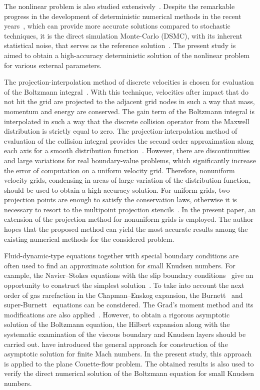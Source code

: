 \documentclass[final]{jfm} %
\begin{document}
The nonlinear problem is also studied extensively~\citep{Garzo2003}.
Despite the remarkable progress in the development of deterministic numerical methods
in the recent years~\citep[see e.g.][]{Dimarco2014,Mieussens2014},
which can provide more accurate solutions compared to stochastic techniques,
it is the direct simulation Monte-Carlo (DSMC), with its inherent statistical noise,
that serves as the reference solution~\citep[see e.g.][]{Cercignani1994,Struchtrup2009,Agrawal2014}.
The present study is aimed to obtain a high-accuracy deterministic solution
of the nonlinear problem for various external parameters.

The projection-interpolation method of discrete velocities is chosen for
evaluation of the Boltzmann integral~\citep{Tcheremissine1998, Tcheremissine2006}.
With this technique, velocities after impact that do not hit the grid
are projected to the adjacent grid nodes in such a way that mass, momentum and energy are conserved.
The gain term of the Boltzmann integral is interpolated in such a way that
the discrete collision operator from the Maxwell distribution is strictly equal to zero.
The projection-interpolation method of evaluation of the collision integral
provides the second order approximation along each axis for a smooth distribution function~\citep{Anikin2012}.
However, there are discontinuities and large variations for real boundary-value problems,
which significantly increase the error of computation on a uniform velocity grid.
Therefore, nonuniform velocity grids, condensing in areas of large variation
of the distribution function, should be used to obtain a high-accuracy solution.
For uniform grids, two projection points are enough to satisfy the conservation laws,
otherwise it is necessary to resort to the multipoint projection stencils~\citep{Dodulad2012}.
In the present paper, an extension of the projection method for nonuniform grids is employed.
The author hopes that the proposed method can yield the most accurate results
among the existing numerical methods for the considered problem.

Fluid-dynamic-type equations together with special boundary conditions
are often used to find an approximate solution for small Knudsen numbers.
For example, the Navier--Stokes equations with the slip boundary conditions~\citep{Ohwada1989a}
give an opportunity to construct the simplest solution~\citep{Sharipov2000}.
To take into account the next order of gas rarefaction in the Chapman--Enskog expansion,
the Burnett~\citep{Reese2003} and super-Burnett~\citep{Agrawal2014} equations can be considered.
The Grad's moment method and its modifications are also applied~\citep{Struchtrup2009}.
However, to obtain a rigorous asymptotic solution of the Boltzmann equation,
the Hilbert expansion along with the systematic examination of the viscous boundary and Knudsen layers
should be carried out. \citet{Sone2000} have introduced the general approach
for construction of the asymptotic solution for finite Mach numbers.
In the present study, this approach is applied to the plane Couette-flow problem.
The obtained results is also used to verify the direct numerical solution
of the Boltzmann equation for small Knudsen numbers.
\end{document}
